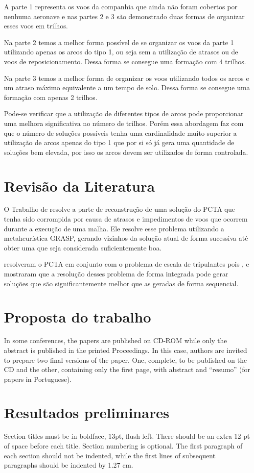 \documentclass[12pt]{article}
\begin{document}
A parte 1 representa os voos da companhia que ainda não foram cobertos por nenhuma aeronave e nas partes 2 e 3 são demonstrado duas formas de organizar esses voos em trilhos. 

Na parte 2 temos a melhor forma possível de se organizar os voos da parte 1 utilizando apenas os arcos do tipo 1, ou seja sem a utilização de atrasos ou de voos de reposicionamento. Dessa forma se consegue uma formação com 4 trilhos.

Na parte 3 temos a melhor forma de organizar os voos utilizando todos os arcos e um atraso máximo equivalente a um tempo de solo. Dessa forma se consegue uma formação com apenas 2 trilhos.

Pode-se verificar que a utilização de diferentes tipos de arcos pode proporcionar uma melhora significativa  no número de trilhos. Porém essa abordagem faz com que o número de soluções possíveis tenha uma cardinalidade muito superior a utilização de arcos apenas do tipo 1 que por si só já gera uma quantidade de soluções bem elevada, por isso os arcos devem ser utilizados de forma controlada. 


\section{Revisão da Literatura} 


O Trabalho de \cite{arguelo1007} resolve a 
parte de reconstrução de uma solução do PCTA que tenha sido corrompida 
por causa de atrasos e impedimentos de voos que ocorrem durante a 
execução de uma malha. Ele resolve esse problema utilizando a 
metaheurística GRASP, gerando vizinhos da solução atual de forma 
sucessiva até obter uma que seja considerada suficientemente boa.
		
\cite{mercier2007} resolveram o PCTA em 
conjunto com o problema de escala de tripulantes pois 
\cite{cordeau2001}, \cite{klabjan2002} e
\cite{mainville2003} mostraram que a resolução desses problema de 
forma integrada pode gerar soluções que são significantemente melhor 
que as geradas de forma sequencial. 


\section{Proposta do trabalho}

In some conferences, the papers are published on CD-ROM while only the
abstract is published in the printed Proceedings. In this case, authors are
invited to prepare two final versions of the paper. One, complete, to be
published on the CD and the other, containing only the first page, with
abstract and ``resumo'' (for papers in Portuguese).

\section{Resultados preliminares}

Section titles must be in boldface, 13pt, flush left. There should be an extra
12 pt of space before each title. Section numbering is optional. The first
paragraph of each section should not be indented, while the first lines of
subsequent paragraphs should be indented by 1.27 cm.




\end{document}
